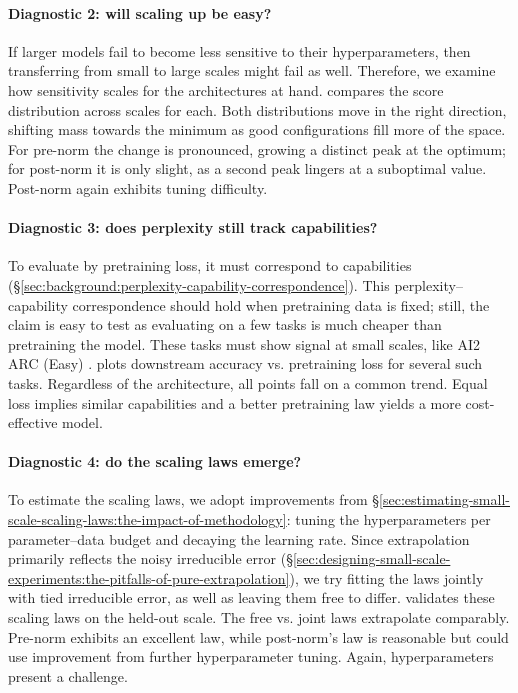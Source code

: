 \paragraph{Diagnostic 2: will scaling up be easy?} If larger models fail to become less sensitive to their hyperparameters, then transferring from small to large scales might fail as well. Therefore, we examine how sensitivity scales for the architectures at hand.  compares the score distribution across scales for each. Both distributions move in the right direction, shifting mass towards the minimum as good configurations fill more of the space. For pre-norm the change is pronounced, growing a distinct peak at the optimum; for post-norm it is only slight, as a second peak lingers at a suboptimal value. Post-norm again exhibits tuning difficulty.



\paragraph{Diagnostic 3: does perplexity still track capabilities?} To evaluate by pretraining loss, it must correspond to capabilities (\S\ref{sec:background:perplexity-capability-correspondence}). This perplexity--capability correspondence should hold when pretraining data is fixed; still, the claim is easy to test as evaluating on a few tasks is much cheaper than pretraining the model. These tasks must show signal at small scales, like AI2 ARC (Easy) \citep{clark2018thinksolvedquestionanswering}.  plots downstream accuracy vs. pretraining loss for several such tasks. Regardless of the architecture, all points fall on a common trend. Equal loss implies similar capabilities and a better pretraining law yields a more cost-effective model.

\paragraph{Diagnostic 4: do the scaling laws emerge?} To estimate the scaling laws, we adopt improvements from \S\ref{sec:estimating-small-scale-scaling-laws:the-impact-of-methodology}: tuning the hyperparameters per parameter--data budget and decaying the learning rate. Since extrapolation primarily reflects the noisy irreducible error (\S\ref{sec:designing-small-scale-experiments:the-pitfalls-of-pure-extrapolation}), we try fitting the laws jointly with tied irreducible error, as well as leaving them free to differ.  validates these scaling laws on the held-out scale. The free vs. joint laws extrapolate comparably. Pre-norm exhibits an excellent law, while post-norm's law is reasonable but could use improvement from further hyperparameter tuning. Again, hyperparameters present a challenge.



